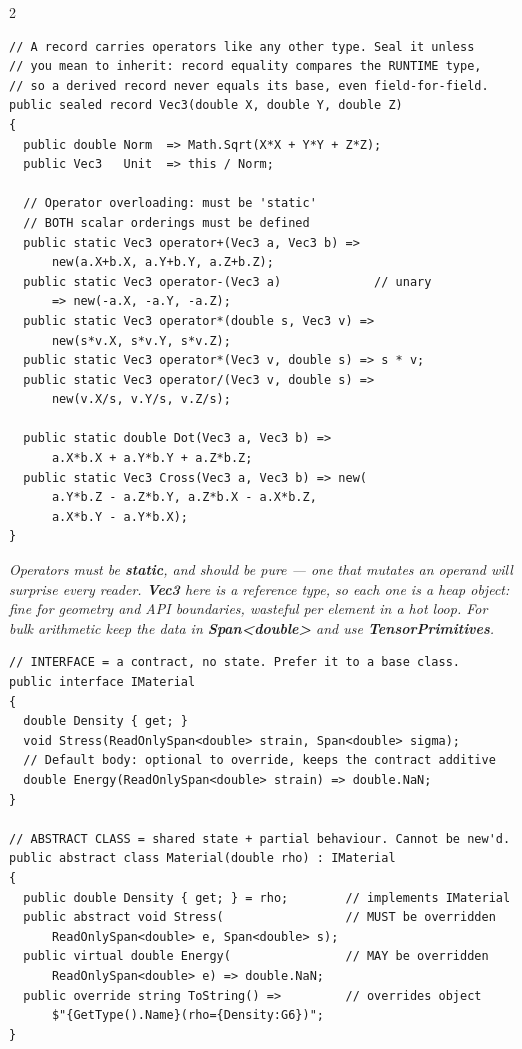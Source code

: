 \documentclass[9pt,a4paper]{extarticle}
\newenvironment{card}[3][acBlue]{%
  \begin{tcolorbox}[
    enhanced, colback=#2, colframe=bdCard,
    coltitle=black, colbacktitle=#2!70!bgHdr,
    fonttitle=\bfseries\fontsize{6.16pt}{7.48pt}\selectfont\MakeUppercase,
    title={#3},
    left=3pt, right=2pt, top=1.4pt, bottom=1.8pt,
    toptitle=1pt, bottomtitle=1pt,
    boxrule=0.4pt,
    borderline west={3pt}{0pt}{#1},
    arc=2pt, before skip=0pt, after skip=1.6mm,
    breakable, toprule at break=0pt, bottomrule at break=0pt,
  ]}{\end{tcolorbox}}
\newcommand{\code}[1]{{\ttfamily\bfseries #1}}
\newcommand{\note}[1]{\par\noindent
  \begin{minipage}{\linewidth}%
  {\fontsize{5.6pt}{6.8pt}\selectfont\itshape #1}%
  \end{minipage}\par}
\begin{document}
\begin{multicols}{2}
\begin{card}[acTeal]{bgTeal}{Records \& Operator Overloading}
\begin{lstlisting}[style=cs]
// A record carries operators like any other type. Seal it unless
// you mean to inherit: record equality compares the RUNTIME type,
// so a derived record never equals its base, even field-for-field.
public sealed record Vec3(double X, double Y, double Z)
{
  public double Norm  => Math.Sqrt(X*X + Y*Y + Z*Z);
  public Vec3   Unit  => this / Norm;

  // Operator overloading: must be 'static'
  // BOTH scalar orderings must be defined
  public static Vec3 operator+(Vec3 a, Vec3 b) =>
      new(a.X+b.X, a.Y+b.Y, a.Z+b.Z);
  public static Vec3 operator-(Vec3 a)             // unary
      => new(-a.X, -a.Y, -a.Z);
  public static Vec3 operator*(double s, Vec3 v) =>
      new(s*v.X, s*v.Y, s*v.Z);
  public static Vec3 operator*(Vec3 v, double s) => s * v;
  public static Vec3 operator/(Vec3 v, double s) =>
      new(v.X/s, v.Y/s, v.Z/s);

  public static double Dot(Vec3 a, Vec3 b) =>
      a.X*b.X + a.Y*b.Y + a.Z*b.Z;
  public static Vec3 Cross(Vec3 a, Vec3 b) => new(
      a.Y*b.Z - a.Z*b.Y, a.Z*b.X - a.X*b.Z,
      a.X*b.Y - a.Y*b.X);
}
\end{lstlisting}
\note{Operators must be \code{static}, and should be pure --- one that
mutates an operand will surprise every reader. \code{Vec3} here is a
reference type, so each one is a heap object: fine for geometry and API
boundaries, wasteful per element in a hot loop. For bulk arithmetic keep the
data in \code{Span<double>} and use \code{TensorPrimitives}.}
\end{card}

\columnbreak

\begin{card}[acNavy]{bgNavy}{Inheritance, Interfaces \& Polymorphism}
\begin{lstlisting}[style=cs]
// INTERFACE = a contract, no state. Prefer it to a base class.
public interface IMaterial
{
  double Density { get; }
  void Stress(ReadOnlySpan<double> strain, Span<double> sigma);
  // Default body: optional to override, keeps the contract additive
  double Energy(ReadOnlySpan<double> strain) => double.NaN;
}

// ABSTRACT CLASS = shared state + partial behaviour. Cannot be new'd.
public abstract class Material(double rho) : IMaterial
{
  public double Density { get; } = rho;        // implements IMaterial
  public abstract void Stress(                 // MUST be overridden
      ReadOnlySpan<double> e, Span<double> s);
  public virtual double Energy(                // MAY be overridden
      ReadOnlySpan<double> e) => double.NaN;
  public override string ToString() =>         // overrides object
      $"{GetType().Name}(rho={Density:G6})";
}


\end{lstlisting}
\end{card}
\end{multicols}
\end{document}
